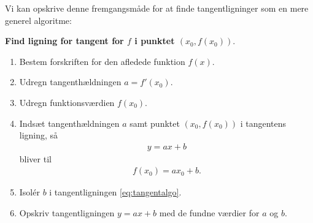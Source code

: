 Vi kan opskrive denne fremgangsmåde for at finde tangentligninger som en mere generel algoritme:
\begin{center}
	\textbf{Find ligning for tangent for $f$ i punktet $(x_0,f(x_0)).$}
\end{center}
\begin{enumerate}
	\item Bestem forskriften for den afledede funktion $f(x)$.
	\item Udregn tangenthældningen $a = f'(x_0)$.
	\item Udregn funktionsværdien $f(x_0)$.
	\item Indsæt tangenthældningen $a$ samt punktet $(x_0,f(x_0))$ i tangentens ligning, så
	\begin{align*}
		y = ax + b
	\end{align*}
	bliver til
	\begin{align}\label{eq:tangentalgo}
		f(x_0) = ax_0 + b.
	\end{align}
	\item Isolér $b$ i tangentligningen \eqref{eq:tangentalgo}.
	\item Opskriv tangentligningen $y = ax + b$ med de fundne værdier for $a$ og $b$.
\end{enumerate}

